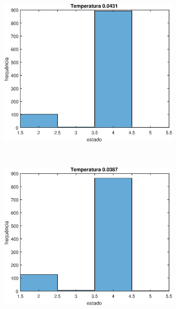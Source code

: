 \documentclass[12pt]{article}
\newenvironment{exercise}[2][Exercício]{\begin{trivlist}
\item[\hskip \labelsep {\bfseries #1}\hskip \labelsep {\bfseries #2.}]}{\end{trivlist}}
\begin{document}
\begin{exercise}{2.e}
\begin{figure}[H]
    \centering
    \begin{subfigure}[b]{0.3\textwidth}
        \includegraphics[width=\textwidth]{figs/ex2e_h4.eps}
    \end{subfigure}
    ~ 
    \begin{subfigure}[b]{0.3\textwidth}
        \includegraphics[width=\textwidth]{figs/ex2e_h5.eps}
    \end{subfigure}
    ~
    \begin{subfigure}[b]{0.3\textwidth}

\end{subfigure}
\end{figure}
\end{exercise}
\end{document}
